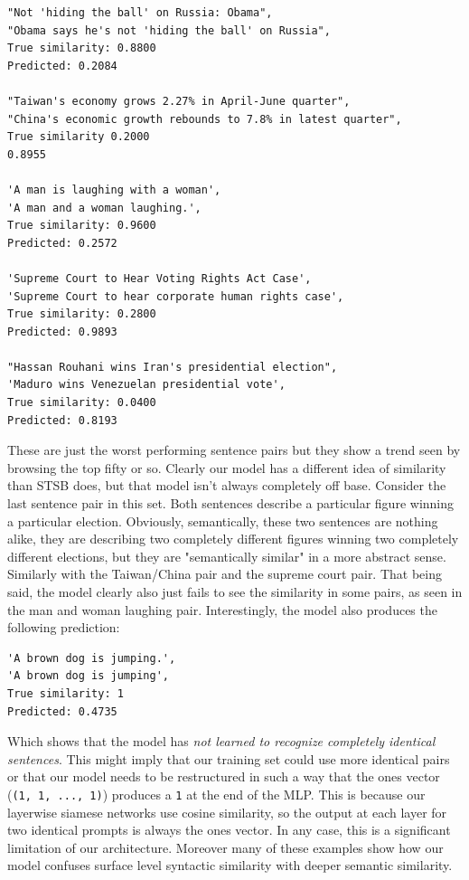 \documentclass{article}
\begin{document}
\begin{verbatim}
"Not 'hiding the ball' on Russia: Obama",
"Obama says he's not 'hiding the ball' on Russia",
True similarity: 0.8800
Predicted: 0.2084

"Taiwan's economy grows 2.27% in April-June quarter",
"China's economic growth rebounds to 7.8% in latest quarter",
True similarity 0.2000
0.8955

'A man is laughing with a woman',
'A man and a woman laughing.',
True similarity: 0.9600
Predicted: 0.2572

'Supreme Court to Hear Voting Rights Act Case',
'Supreme Court to hear corporate human rights case',
True similarity: 0.2800
Predicted: 0.9893

"Hassan Rouhani wins Iran's presidential election",
'Maduro wins Venezuelan presidential vote',
True similarity: 0.0400
Predicted: 0.8193
\end{verbatim}
These are just the worst performing sentence pairs but they show a trend seen by browsing the top fifty or so. Clearly our model has a different idea of similarity than STSB does, but that model isn't always completely off base. Consider the last sentence pair in this set. Both sentences describe a particular figure winning a particular election. Obviously, semantically, these two sentences are nothing alike, they are describing two completely different figures winning two completely different elections, but they are "semantically similar" in a more abstract sense. Similarly with the Taiwan/China pair and the supreme court pair. That being said, the model clearly also just fails to see the similarity in some pairs, as seen in the man and woman laughing pair. Interestingly, the model also produces the following prediction:
\begin{verbatim}
'A brown dog is jumping.',
'A brown dog is jumping',
True similarity: 1
Predicted: 0.4735
\end{verbatim}
Which shows that the model has \textit{not learned to recognize completely identical sentences}. This might imply that our training set could use more identical pairs or that our model needs to be restructured in such a way that the ones vector (\verb|(1, 1, ..., 1)|) produces a \verb|1| at the end of the MLP. This is because our layerwise siamese networks use cosine similarity, so the output at each layer for two identical prompts is always the ones vector. In any case, this is a significant limitation of our architecture. Moreover many of these examples show how our model confuses surface level syntactic similarity with deeper semantic similarity.
\end{document}
